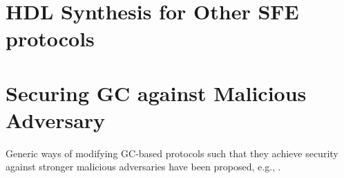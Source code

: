 \section{HDL Synthesis for Other SFE protocols}

\section{Securing GC against Malicious Adversary}
Generic ways of modifying GC-based protocols such that they achieve security against stronger malicious adversaries have been proposed, e.g., \cite{lindell2007efficient, lindell2012secure, nielsen2009lego}.
